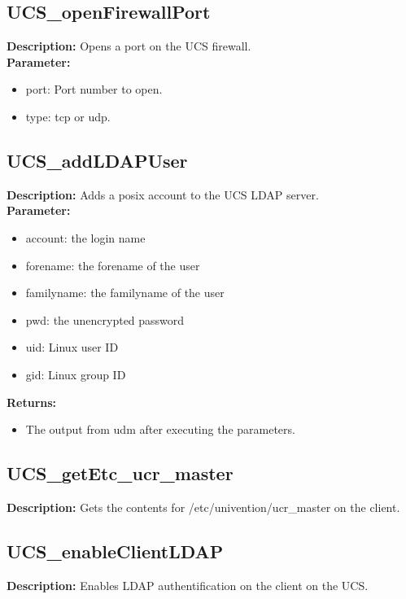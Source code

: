 \subsection{UCS\_openFirewallPort}
\textbf{Description:} Opens a port on the UCS firewall.\\
\textbf{Parameter:}
\begin{itemize}
\item port: Port number to open.
\item type: tcp or udp.
\end{itemize}

\subsection{UCS\_addLDAPUser}
\textbf{Description:} Adds a posix account to the UCS LDAP server.\\
\textbf{Parameter:}
\begin{itemize}
\item account: the login name
\item forename: the forename of the user
\item familyname: the familyname of the user
\item pwd: the unencrypted password
\item uid: Linux user ID
\item gid: Linux group ID
\end{itemize}
\textbf{Returns:}
\begin{itemize}
\item The output from udm after executing the parameters.
\end{itemize}

\subsection{UCS\_getEtc\_ucr\_master}
\textbf{Description:} Gets the contents for /etc/univention/ucr\_master on the client.\\

\subsection{UCS\_enableClientLDAP}
\textbf{Description:} Enables LDAP authentification on the client on the UCS.\\


